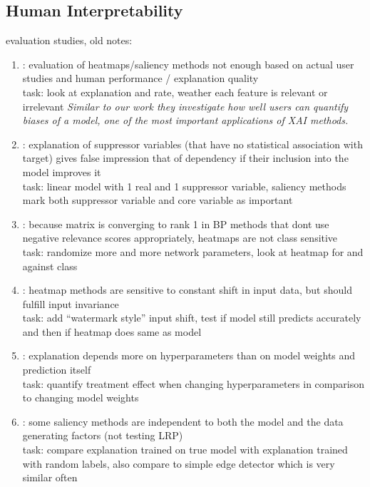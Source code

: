 \subsection{Human Interpretability}
{\color{gray} 
evaluation studies, old notes:
\begin{enumerate}
      \item \cite{Sixt2022a}: evaluation of heatmaps/saliency methods not enough based on actual user studies and human performance / explanation quality
            \\ task: look at explanation and rate, weather each feature is relevant or irrelevant
            \textit{Similar to our work they investigate how well users can quantify biases of a model, one of the most important applications of XAI methods.}
      \item \cite{Wilming2023}: explanation of suppressor variables (that have no statistical association with target) gives false impression that of dependency if their inclusion into the model improves it
            \\ task: linear model with 1 real and 1 suppressor variable, saliency methods mark both suppressor variable and core variable as important
      \item \cite{Sixt2020}: because matrix is converging to rank 1 in BP methods that dont use negative relevance scores appropriately, heatmaps are not class sensitive
            \\ task: randomize more and more network parameters, look at heatmap for and against class
      \item \cite{Kindermans2019}: heatmap methods are sensitive to constant shift in input data, but should fulfill input invariance
            \\ task: add “watermark style” input shift, test if model still predicts accurately and then if heatmap does same as model
      \item \cite{Karimi2023}: explanation depends more on hyperparameters than on model weights and prediction itself
            \\ task: quantify treatment effect when changing hyperparameters in comparison to changing model weights
      \item \cite{Adebayo2018}: some saliency methods are independent to both the model and the data generating factors (not testing LRP)
            \\ task: compare explanation trained on true model with explanation trained with random labels, also compare to simple edge detector which is very similar often

\end{enumerate}}
